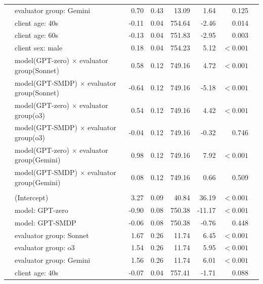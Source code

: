 \documentclass{wiley-article}
\begin{document}
{\begin{longtable}{@{}l p{} rrrrrr@{}}
        & evaluator group: Gemini                                 &  0.70 & 0.43 &  13.09 &   1.64 & 0.125 \\
        & client age: 40s                                         & -0.11 & 0.04 & 754.64 &  -2.46 & 0.014 \\
        & client age: 60s                                         & -0.13 & 0.04 & 751.83 &  -2.95 & 0.003 \\
        & client sex: male                                        &  0.18 & 0.04 & 754.23 &   5.12 & $<\!0.001$ \\
        & model(GPT-zero) $\times$ evaluator group(Sonnet)        &  0.58 & 0.12 & 749.16 &   4.72 & $<\!0.001$ \\
        & model(GPT-SMDP) $\times$ evaluator group(Sonnet)        & -0.64 & 0.12 & 749.16 &  -5.18 & $<\!0.001$ \\
        & model(GPT-zero) $\times$ evaluator group(o3)            &  0.54 & 0.12 & 749.16 &   4.42 & $<\!0.001$ \\
        & model(GPT-SMDP) $\times$ evaluator group(o3)            & -0.04 & 0.12 & 749.16 &  -0.32 & 0.746 \\
        & model(GPT-zero) $\times$ evaluator group(Gemini)        &  0.98 & 0.12 & 749.16 &   7.92 & $<\!0.001$ \\
        & model(GPT-SMDP) $\times$ evaluator group(Gemini)        &  0.08 & 0.12 & 749.16 &   0.66 & 0.509 \\
      \addlinespace
      \multicolumn{7}{l}{\textbf{OVR}}\\
        & (Intercept)                                             &  3.27 & 0.09 &  40.84 &  36.19 & $<\!0.001$ \\
        & model: GPT-zero                                         & -0.90 & 0.08 & 750.38 & -11.17 & $<\!0.001$ \\
        & model: GPT-SMDP                                         & -0.06 & 0.08 & 750.38 &  -0.76 & 0.448 \\
        & evaluator group: Sonnet                                 &  1.67 & 0.26 &  11.74 &   6.45 & $<\!0.001$ \\
        & evaluator group: o3                                     &  1.54 & 0.26 &  11.74 &   5.95 & $<\!0.001$ \\
        & evaluator group: Gemini                                 &  1.56 & 0.26 &  11.74 &   6.01 & $<\!0.001$ \\
        & client age: 40s                                         & -0.07 & 0.04 & 757.41 &  -1.71 & 0.088 \\

\end{longtable}}
\end{document}
